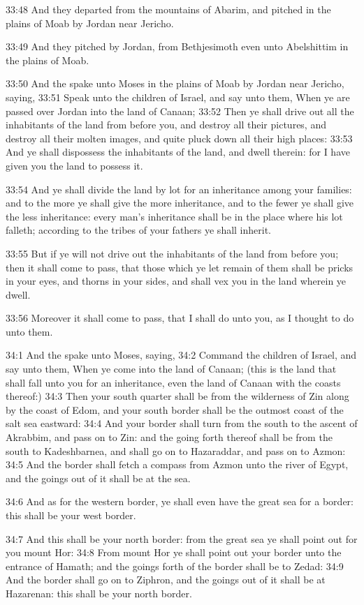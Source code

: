 33:48 And they departed from the mountains of Abarim, and pitched in the plains of Moab by Jordan near Jericho.

33:49 And they pitched by Jordan, from Bethjesimoth even unto Abelshittim in the plains of Moab.

33:50 And the \LORD spake unto Moses in the plains of Moab by Jordan near Jericho, saying, 33:51 Speak unto the children of Israel, and say unto them, When ye are passed over Jordan into the land of Canaan; 33:52 Then ye shall drive out all the inhabitants of the land from before you, and destroy all their pictures, and destroy all their molten images, and quite pluck down all their high places: 33:53 And ye shall dispossess the inhabitants of the land, and dwell therein: for I have given you the land to possess it.

33:54 And ye shall divide the land by lot for an inheritance among your families: and to the more ye shall give the more inheritance, and to the fewer ye shall give the less inheritance: every man's inheritance shall be in the place where his lot falleth; according to the tribes of your fathers ye shall inherit.

33:55 But if ye will not drive out the inhabitants of the land from before you; then it shall come to pass, that those which ye let remain of them shall be pricks in your eyes, and thorns in your sides, and shall vex you in the land wherein ye dwell.

33:56 Moreover it shall come to pass, that I shall do unto you, as I thought to do unto them.

34:1 And the \LORD spake unto Moses, saying, 34:2 Command the children of Israel, and say unto them, When ye come into the land of Canaan; (this is the land that shall fall unto you for an inheritance, even the land of Canaan with the coasts thereof:) 34:3 Then your south quarter shall be from the wilderness of Zin along by the coast of Edom, and your south border shall be the outmost coast of the salt sea eastward: 34:4 And your border shall turn from the south to the ascent of Akrabbim, and pass on to Zin: and the going forth thereof shall be from the south to Kadeshbarnea, and shall go on to Hazaraddar, and pass on to Azmon: 34:5 And the border shall fetch a compass from Azmon unto the river of Egypt, and the goings out of it shall be at the sea.

34:6 And as for the western border, ye shall even have the great sea for a border: this shall be your west border.

34:7 And this shall be your north border: from the great sea ye shall point out for you mount Hor: 34:8 From mount Hor ye shall point out your border unto the entrance of Hamath; and the goings forth of the border shall be to Zedad: 34:9 And the border shall go on to Ziphron, and the goings out of it shall be at Hazarenan: this shall be your north border.

